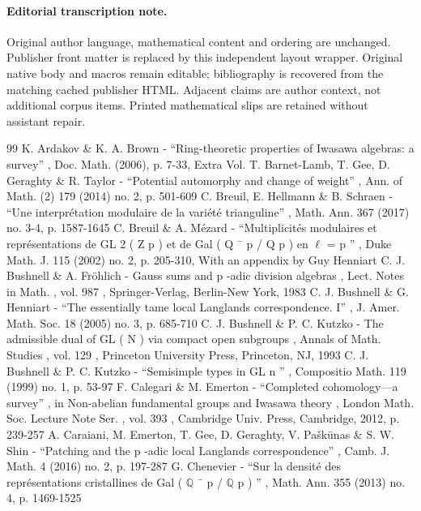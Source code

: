 \documentclass[11pt]{article}
\begin{document}
\paragraph{Editorial transcription note.}
Original author language, mathematical content and ordering are unchanged. Publisher front matter is replaced by this independent layout wrapper. Original native body and macros remain editable; bibliography is recovered from the matching cached publisher HTML. Adjacent claims are author context, not additional corpus items. Printed mathematical slips are retained without assistant repair.
\clearpage

\begin{thebibliography}{99}
 K. Ardakov \& K. A. Brown - “Ring-theoretic properties of Iwasawa algebras: a survey” , Doc. Math. (2006), p. 7-33, Extra Vol.
 T. Barnet-Lamb, T. Gee, D. Geraghty \& R. Taylor - “Potential automorphy and change of weight” , Ann. of Math. (2) 179 (2014) no. 2, p. 501-609
 C. Breuil, E. Hellmann \& B. Schraen - “Une interprétation modulaire de la variété trianguline” , Math. Ann. 367 (2017) no. 3-4, p. 1587-1645
 C. Breuil \& A. Mézard - “Multiplicités modulaires et représentations de GL 2 ( Z p ) et de Gal ( Q ¯ p / Q p ) en \(\ell\) = p ” , Duke Math. J. 115 (2002) no. 2, p. 205-310, With an appendix by Guy Henniart
 C. J. Bushnell \& A. Fröhlich - Gauss sums and p -adic division algebras , Lect. Notes in Math. , vol. 987 , Springer-Verlag, Berlin-New York, 1983
 C. J. Bushnell \& G. Henniart - “The essentially tame local Langlands correspondence. I” , J. Amer. Math. Soc. 18 (2005) no. 3, p. 685-710
 C. J. Bushnell \& P. C. Kutzko - The admissible dual of GL ( N ) via compact open subgroups , Annals of Math. Studies , vol. 129 , Princeton University Press, Princeton, NJ, 1993
 C. J. Bushnell \& P. C. Kutzko - “Semisimple types in GL n ” , Compositio Math. 119 (1999) no. 1, p. 53-97
 F. Calegari \& M. Emerton - “Completed cohomology—a survey” , in Non-abelian fundamental groups and Iwasawa theory , London Math. Soc. Lecture Note Ser. , vol. 393 , Cambridge Univ. Press, Cambridge, 2012, p. 239-257
 A. Caraiani, M. Emerton, T. Gee, D. Geraghty, V. Paškūnas \& S. W. Shin - “Patching and the p -adic local Langlands correspondence” , Camb. J. Math. 4 (2016) no. 2, p. 197-287
 G. Chenevier - “Sur la densité des représentations cristallines de Gal ( \(\mathbb Q\) ¯ p / \(\mathbb Q\) p ) ” , Math. Ann. 355 (2013) no. 4, p. 1469-1525

\end{thebibliography}
\end{document}
